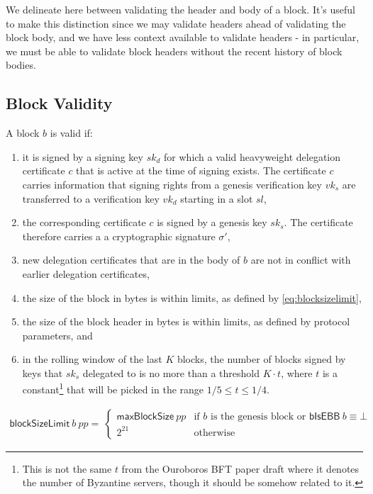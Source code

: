 \documentclass[11pt,a4paper]{article}
\newcommand{\var}[1]{\mathit{#1}}
\newcommand{\fun}[1]{\mathsf{#1}}
\newcommand{\blocksizelimitname}{blockSizeLimit}
\newcommand{\maxblocksizename}{maxBlockSize}
\newcommand{\isebbname}{bIsEBB}
\newcommand{\blocksizelimit}[2]{\fun{\blocksizelimitname} ~ #1 ~ #2}
\newcommand{\maxblocksize}[1]{\fun{\maxblocksizename} ~ #1}
\newcommand{\isebb}[1]{\fun{\isebbname} ~ #1}
\begin{document}
We delineate here between validating the header and body of a block. It's useful
to make this distinction since we may validate headers ahead of validating the
block body, and we have less context available to validate headers - in
particular, we must be able to validate block headers without the recent history
of block bodies.


\subsection{Block Validity}
\label{sec:block-valid}

A block $\var{b}$ is valid if:
%
\begin{enumerate}
\item it is signed by a signing key $sk_d$ for which a valid heavyweight
  delegation certificate $c$ that is active at the time of signing exists.
  The certificate $c$ carries information that signing rights from a
  genesis verification key $vk_s$ are transferred to a verification key $vk_d$
  starting in a slot $sl$,
\item the corresponding certificate $c$ is signed by a genesis key $sk_s$. The
  certificate therefore carries a a cryptographic signature $\sigma'$,
\item new delegation certificates that are in the body of $b$ are not in
  conflict with earlier delegation certificates,
\item the size of the block in bytes is within limits, as defined by
  \eqref{eq:blocksizelimit},
\item the size of the block header in bytes is within limits, as defined by
  protocol parameters, and
\item in the rolling window of the last $K$ blocks, the number of blocks
  signed by keys that $sk_s$ delegated to is no more than a threshold
  $K \cdot t$, where $t$ is a constant\footnote{This is not the same $t$ from
    the Ouroboros BFT paper draft where it denotes the number of Byzantine
    servers, though it should be somehow related to it.}  that will be picked
  in the range $1/5 \leq t \leq 1/4$.
\end{enumerate}

\begin{align}
  \label{eq:blocksizelimit}
  \blocksizelimit{b}{\var{pp}} = \
  \begin{cases}
    \maxblocksize{\var{pp}} & \text{if $b$ is the genesis block or } \isebb{b} \equiv \bot \\
    2^{21} & \text{otherwise}
  \end{cases}
\end{align}
\end{document}
